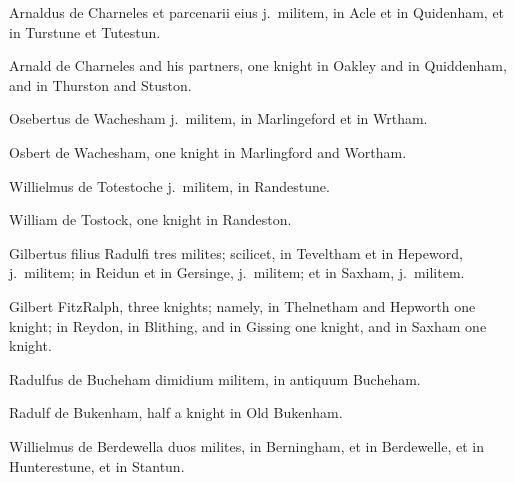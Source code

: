 \documentclass{book}
\begin{document}
\begin{paracol}{2}
\switchcolumn*

\begin{otherlanguage}{latin}
Arnaldus de Charneles et parcenarii eius j.\ militem, in Acle et in Quidenham, et in Turstune et Tutestun.
\end{otherlanguage}

\switchcolumn

Arnald de Charneles and his partners, one knight in Oakley and in Quiddenham, and in Thurston and Stuston.

\switchcolumn*

\begin{otherlanguage}{latin}
Osebertus de Wachesham j.\ militem, in Marlingeford et in Wrtham.
\end{otherlanguage}

\switchcolumn

Osbert de Wachesham, one knight in Marlingford and Wortham.

\switchcolumn*

\begin{otherlanguage}{latin}
Willielmus de Totestoche j.\ militem, in Randestune.
\end{otherlanguage}

\switchcolumn

William de Tostock, one knight in Randeston.

\switchcolumn*

\begin{otherlanguage}{latin}
Gilbertus filius Radulfi tres milites; scilicet, in Teveltham et in Hepeword, j.\ militem; in Reidun et in Gersinge, j.\ militem; et in Saxham, j.\ militem.
\end{otherlanguage}

\switchcolumn

Gilbert FitzRalph, three knights; namely, in Thelnetham and Hepworth one knight; in Reydon, in Blithing, and in Gissing one knight, and in Saxham one knight.

\switchcolumn*

\begin{otherlanguage}{latin}
Radulfus de Bucheham dimidium militem, in antiquum Bucheham.
\end{otherlanguage}

\switchcolumn

Radulf de Bukenham, half a knight in Old Bukenham.

\switchcolumn*

\begin{otherlanguage}{latin}
Willielmus de Berdewella duos milites, in Berningham, et in Berdewelle, et in Hunterestune, et in Stantun.
\end{otherlanguage}


\end{paracol}
\end{document}
